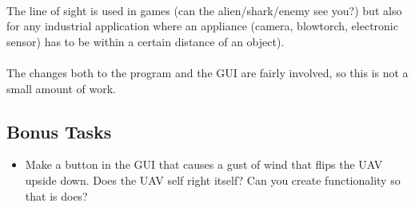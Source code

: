 \documentclass[11pt]{book}
\begin{document}
\paragraph{} The line of sight is used in games (can the alien/shark/enemy see
you?) but also for any industrial application where an appliance (camera,
blowtorch, electronic sensor) has to be within a certain distance of an
object).

\paragraph{} The changes both to the program and the GUI are fairly involved,
so this is not a small amount of work.

\subsection{Bonus Tasks}

\begin{itemize}
\item Make a button in the GUI that causes a gust of wind that flips the UAV upside down. Does the UAV self right itself? Can you create functionality so that is does?
\end{itemize}

\clearpage
\end{document}
